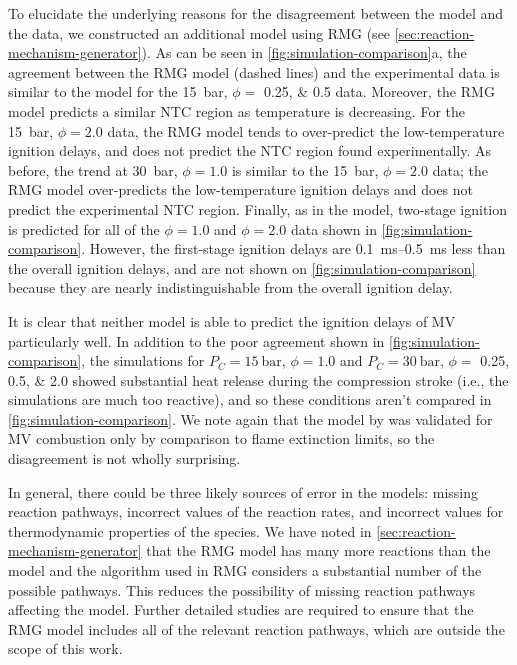 \documentclass[letterpaper, review]{elsarticle}
\begin{document}
To elucidate the underlying reasons for the disagreement between the \citet{Dievart2013} model and
the data, we constructed an additional model using RMG (see
\cref{sec:reaction-mechanism-generator}). As can be seen in \cref{fig:simulation-comparison}a, the
agreement between the RMG model (dashed lines) and the experimental data is similar to the
\citet{Dievart2013} model for the \SI{15}{\bar}, \(\phi =\) \numlist{0.25; 0.5} data. Moreover, the
RMG model predicts a similar NTC region as temperature is decreasing. For the \SI{15}{\bar}, \(\phi =
2.0\) data, the RMG model tends to over-predict the low-temperature ignition delays, and does not
predict the NTC region found experimentally. As before, the trend at \SI{30}{\bar}, \(\phi=1.0\) is
similar to the \SI{15}{\bar}, \(\phi=2.0\) data; the RMG model over-predicts the low-temperature
ignition delays and does not predict the experimental NTC region. Finally, as in the
\citet{Dievart2013} model, two-stage ignition is predicted for all of the \(\phi=1.0\) and
\(\phi=2.0\) data shown in \cref{fig:simulation-comparison}. However, the first-stage ignition
delays are \SIrange{0.1}{0.5}{\ms} less than the overall ignition delays, and are not shown on
\cref{fig:simulation-comparison} because they are nearly indistinguishable from the overall ignition
delay.

It is clear that neither model is able to predict the ignition delays of MV particularly well. In
addition to the poor agreement shown in \cref{fig:simulation-comparison}, the simulations for
\(P_C = \SI{15}{\bar}\), \(\phi=1.0\) and \(P_C = \SI{30}{\bar}\), \(\phi=\) \numlist{0.25;0.5;2.0}
showed substantial heat release during the compression stroke (i.e., the simulations are much too
reactive), and so these conditions aren't compared in \cref{fig:simulation-comparison}. We note
again that the model by \citet{Dievart2013} was validated for MV combustion only by comparison to
flame extinction limits, so the disagreement is not wholly surprising.

In general, there could be three likely sources of error in the models: missing reaction pathways,
incorrect values of the reaction rates, and incorrect values for thermodynamic properties of the
species. We have noted in \cref{sec:reaction-mechanism-generator} that the RMG model has many more
reactions than the \citet{Dievart2013} model and the algorithm used in RMG considers a substantial
number of the possible pathways. This reduces the possibility of missing reaction pathways affecting
the model. Further detailed studies are required to ensure that the RMG model includes all of the
relevant reaction pathways, which are outside the scope of this work.
\end{document}
